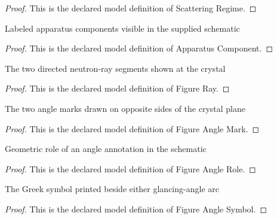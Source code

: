 \begin{proof}
  This is the declared model definition of Scattering Regime.
\end{proof}
\begin{definition}
  \label{def:physics:phyx-mini-0557:phyxminiproblems-problemphyxmini0557-apparatuscomponent}
  Labeled apparatus components visible in the supplied schematic
\end{definition}
\begin{proof}
  This is the declared model definition of Apparatus Component.
\end{proof}
\begin{definition}
  \label{def:physics:phyx-mini-0557:phyxminiproblems-problemphyxmini0557-figureray}
  The two directed neutron-ray segments shown at the crystal
\end{definition}
\begin{proof}
  This is the declared model definition of Figure Ray.
\end{proof}
\begin{definition}
  \label{def:physics:phyx-mini-0557:phyxminiproblems-problemphyxmini0557-figureanglemark}
  The two angle marks drawn on opposite sides of the crystal plane
\end{definition}
\begin{proof}
  This is the declared model definition of Figure Angle Mark.
\end{proof}
\begin{definition}
  \label{def:physics:phyx-mini-0557:phyxminiproblems-problemphyxmini0557-figureanglerole}
  Geometric role of an angle annotation in the schematic
\end{definition}
\begin{proof}
  This is the declared model definition of Figure Angle Role.
\end{proof}
\begin{definition}
  \label{def:physics:phyx-mini-0557:phyxminiproblems-problemphyxmini0557-figureanglesymbol}
  The Greek symbol printed beside either glancing-angle arc
\end{definition}
\begin{proof}
  This is the declared model definition of Figure Angle Symbol.
\end{proof}
